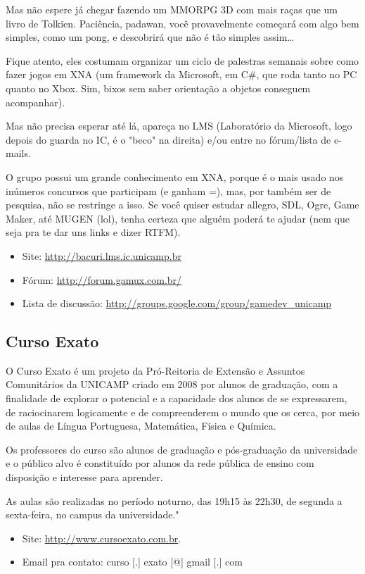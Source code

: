 Mas não espere já chegar fazendo um MMORPG 3D com mais raças que um livro de
Tolkien. Paciência, padawan, você provavelmente começará com algo bem simples,
como um pong, e descobrirá que não é tão simples assim{\dots}

Fique atento, eles costumam organizar um ciclo de palestras semanais sobre como
fazer jogos em XNA (um framework da Microsoft, em C\#, que roda tanto no PC
quanto no Xbox. Sim, bixos sem saber orientação a objetos conseguem acompanhar).

Mas não precisa esperar até lá, apareça no LMS (Laboratório da Microsoft, logo
depois do guarda no IC, é o "beco" na direita) e/ou entre no fórum/lista de
e-mails.

O grupo possui um grande conhecimento em XNA, porque é o mais usado nos inúmeros
concursos que participam (e ganham =), mas, por também ser de pesquisa, não se
restringe a isso. Se você quiser estudar allegro, SDL, Ogre, Game Maker, até
MUGEN (lol), tenha certeza que alguém poderá te ajudar (nem que seja pra te dar
uns links e dizer RTFM).

\begin{itemize}
\item  Site: \url{http://bacuri.lms.ic.unicamp.br}
\item  Fórum: \url{http://forum.gamux.com.br/}
\item  Lista de discussão: \url{http://groups.google.com/group/gamedev_unicamp}
\end{itemize}

\subsection{Curso Exato}

O Curso Exato é um projeto da Pró-Reitoria de Extensão e Assuntos
Comunitários da UNICAMP criado em 2008 por alunos de graduação, com a
finalidade de explorar o potencial e a capacidade dos alunos de se
expressarem, de raciocinarem logicamente e de compreenderem o mundo que os
cerca, por meio de aulas de Língua Portuguesa, Matemática, Física e Química.

Os professores do curso são alunos de graduação e pós-graduação da
universidade e o público alvo é constituído por alunos da rede pública de
ensino com disposição e interesse para aprender.

As aulas são realizadas no período noturno, das 19h15 às 22h30, de segunda
a sexta-feira, no campus da universidade."

\begin{itemize}
\item  Site: \url{http://www.cursoexato.com.br}.
\item  Email pra contato: curso [.] exato [@] gmail [.] com
\end{itemize}

